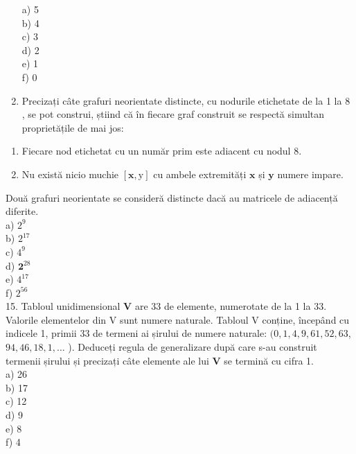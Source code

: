 \documentclass[10pt]{article}
\begin{document}
\begin{enumerate}
a) 5\\
b) 4\\
c) 3\\
d) 2\\
e) 1\\
f) 0
  \item Precizați câte grafuri neorientate distincte, cu nodurile etichetate de la 1 la 8 , se pot construi, știind că în fiecare graf construit se respectă simultan proprietățile de mai jos:
\end{enumerate}

\begin{enumerate}
  \item Fiecare nod etichetat cu un număr prim este adiacent cu nodul 8.
  \item Nu există nicio muchie $[\mathbf{x}, \mathrm{y}]$ cu ambele extremități $\mathbf{x}$ și $\mathbf{y}$ numere impare.
\end{enumerate}

Două grafuri neorientate se consideră distincte dacă au matricele de adiacență diferite.\\
a) $2^{9}$\\
b) $2^{17}$\\
c) $4^{9}$\\
d) $\mathbf{2}^{28}$\\
e) $4^{17}$\\
f) $2^{56}$\\
15. Tabloul unidimensional $\mathbf{V}$ are 33 de elemente, numerotate de la 1 la 33. Valorile elementelor din V sunt numere naturale. Tabloul V conține, începând cu indicele 1, primii 33 de termeni ai șirului de numere naturale: $(0,1,4,9,61,52,63$, $94,46,18,1, \ldots$ ). Deduceți regula de generalizare după care s-au construit termenii șirului și precizați câte elemente ale lui $\mathbf{V}$ se termină cu cifra 1.\\
a) 26\\
b) 17\\
c) 12\\
d) 9\\
e) 8\\
f) 4
\end{document}
